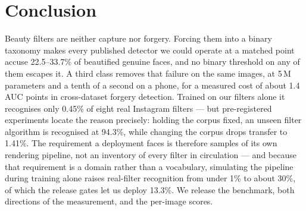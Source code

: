 \documentclass[conference]{IEEEtran}
\begin{document}
\section{Conclusion}
Beauty filters are neither capture nor forgery. Forcing them into a binary taxonomy makes
every published detector we could operate at a matched point accuse 22.5--33.7\% of beautified genuine faces, and no
binary threshold on any of them escapes it. A third class removes that failure on the same
images, at 5\,M parameters and a tenth of a second on a phone, for a measured cost of about 1.4
AUC points in cross-dataset forgery detection. Trained on our filters alone it recognises only
0.45\% of eight real Instagram filters --- but pre-registered experiments locate the reason precisely:
holding the corpus fixed, an unseen filter algorithm is recognised at 94.3\%, while changing
the corpus drops transfer to 1.41\%. The requirement a deployment faces is therefore samples of
its own rendering pipeline, not an inventory of every filter in circulation --- and because that
requirement is a domain rather than a vocabulary, simulating the pipeline during training alone
raises real-filter recognition from under 1\% to about 30\%, of which the release gates let us
deploy 13.3\%. We release the
benchmark, both directions of the measurement, and the per-image scores.
\end{document}

